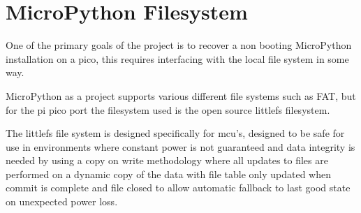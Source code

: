 \clearpage
\section{MicroPython Filesystem}
One of the primary goals of the project is to recover a non booting MicroPython installation on a pico, this requires interfacing with the local file system in some way.

MicroPython as a project supports various different file systems such as FAT, but for the pi pico port the filesystem used is the open source littlefs filesystem\cite{MicroPythonProject2023}.

The littlefs file system is designed specifically for \gls{mcu}'s, designed to be safe for use in environments where constant power is not guaranteed and data integrity is needed by using a copy on write methodology where all updates to files are performed on a dynamic copy of the data with file table only updated when commit is complete and file closed to allow automatic fallback to last good state on unexpected power loss.





